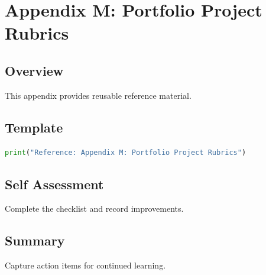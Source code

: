 \chapter{Appendix M: Portfolio Project Rubrics}
\label{chap:vol16-3}



\section{Overview}
This appendix provides reusable reference material.

\section{Template}
\begin{lstlisting}[language=Python]
print("Reference: Appendix M: Portfolio Project Rubrics")
\end{lstlisting}

\section{Self Assessment}
\begin{exercise}
Complete the checklist and record improvements.
\end{exercise}

\section{Summary}
Capture action items for continued learning.
